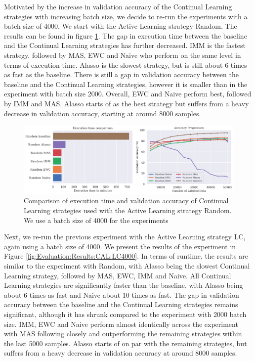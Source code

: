 Motivated by the increase in validation accuracy of the Continual Learning strategies with increasing batch size, we decide to re-run the experiments with a batch size of 4000. We start with the Active Learning
strategy Random. The results can be found in figure \ref{fig:Evaluation:Results:CAL:Random4000}. The gap in execution time between the baseline and the Continual Learning strategies has further decreased. IMM is
the fastest strategy, followed by MAS, EWC and Naive who perform on the same level in terms of execution time. Alasso is the slowest strategy, but is still about 6 times as fast as the baseline. There is still a
gap in validation accuracy between the baseline and the Continual Learning strategies, however it is smaller than in the experiment with batch size 2000. Overall, EWC and Naive perform best, followed by IMM and MAS.
Alasso starts of as the best strategy but suffers from a heavy decrease in validation accuracy, starting at around 8000 samples. \par

\begin{figure}[h]
    \centering
    \includegraphics[width=\linewidth]{images/results_CAL/Random_CAL_4000b.png}
    \caption[Continual Active Learning Random 4000 batch size]{Comparison of execution time and validation accuracy of Continual Learning strategies used with the Active Learning strategy
    Random. We use a batch size of 4000 for the experiments}
    \label{fig:Evaluation:Results:CAL:Random4000}
\end{figure}

Next, we re-run the previous experiment with the Active Learning strategy LC, again using a batch size of 4000. We present the results of the experiment in Figure \ref{fig:Evaluation:Results:CAL:LC4000}. In terms of runtime,
the results are similar to the experiment with Random, with Alasso being the slowest Continual Learning strategy, followed by MAS, EWC, IMM and Naive. All Continual Learning strategies are significantly faster than the baseline,
with Alasso being about 6 times as fast and Naive about 10 times as fast. The gap in validation accuracy between the baseline and the Continual Learning strategies remains significant, although it has shrunk compared to the
experiment with 2000 batch size. IMM, EWC and Naive perform almost identically across the experiment with MAS following closely and outperforming the remaining strategies within the last 5000 samples. Alasso starts of on par
with the remaining strategies, but suffers from a heavy decrease in validation accuracy at around 8000 samples. \par

